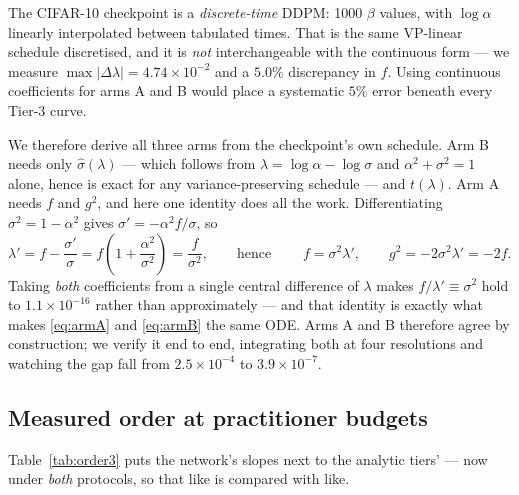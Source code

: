 \documentclass[11pt,a4paper]{article}
\newcommand{\lam}{\lambda}
\begin{document}
The CIFAR-10 checkpoint is a \emph{discrete-time} DDPM: 1000 $\beta$ values, with
$\log\alpha$ linearly interpolated between tabulated times. That is the same
VP-linear schedule discretised, and it is \emph{not} interchangeable with the
continuous form --- we measure $\max|\Delta\lam| = 4.74\times10^{-2}$ and a
$5.0\%$ discrepancy in $f$. Using continuous coefficients for arms A and B would
place a systematic $5\%$ error beneath every Tier-3 curve.

We therefore derive all three arms from the checkpoint's own schedule. Arm B
needs only $\hat\sigma(\lam)$ --- which follows from $\lam = \log\alpha-\log\sigma$
and $\alpha^2+\sigma^2=1$ alone, hence is exact for any variance-preserving
schedule --- and $t(\lam)$. Arm A needs $f$ and $g^2$, and here one identity does
all the work. Differentiating $\sigma^2 = 1-\alpha^2$ gives
$\sigma' = -\alpha^2 f/\sigma$, so
\begin{equation}
\lam' = f - \frac{\sigma'}{\sigma} = f\left(1+\frac{\alpha^2}{\sigma^2}\right) = \frac{f}{\sigma^2},
\qquad\text{hence}\qquad
\boxed{\;f = \sigma^2\lam',\qquad g^2 = -2\sigma^2\lam' = -2f.\;}
\label{eq:vpid}
\end{equation}
Taking \emph{both} coefficients from a single central difference of $\lam$ makes
$f/\lam' \equiv \sigma^2$ hold to $1.1\times10^{-16}$ rather than approximately
--- and that identity is exactly what makes \eqref{eq:armA} and \eqref{eq:armB}
the same ODE. Arms A and B therefore agree by construction; we verify it end to
end, integrating both at four resolutions and watching the gap fall from
$2.5\times10^{-4}$ to $3.9\times10^{-7}$.

\subsection{Measured order at practitioner budgets}

Table~\ref{tab:order3} puts the network's slopes next to the analytic tiers' ---
now under \emph{both} protocols, so that like is compared with like.
\end{document}
